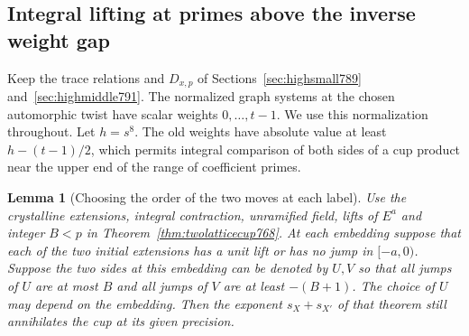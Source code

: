 \documentclass[a4paper,11pt]{article}
\newtheorem{lemma}[proposition]{Lemma}
\theoremstyle{definition}
\theoremstyle{remark}
\numberwithin{equation}{section}
\begin{document}
\subsection{Integral lifting at primes above the inverse weight gap}
\label{sec:hightail792}
Keep the trace relations and \(D_{x,p}\) of
Sections~\ref{sec:highsmall789} and~\ref{sec:highmiddle791}.
The normalized graph systems at the chosen automorphic twist
have scalar weights \(0,\ldots,t-1\). We use this normalization
throughout. Let \(h=s^8\). The old weights have absolute
value at least \(h-(t-1)/2\), which permits integral comparison
of both sides of a cup product near the upper end of the range
of coefficient primes.

\begin{lemma}[Choosing the order of the two moves at each label]
\leavevmode\label{lem:swappable792}
Use the crystalline extensions, integral contraction, unramified
field, lifts of \(E^a\) and integer \(B<p\) in
Theorem~\ref{thm:twolatticecup768}. At each embedding suppose
that each of the two initial extensions has a unit lift or has
no jump in \([-a,0)\). Suppose the two sides at this embedding
can be denoted by \(U,V\) so that all jumps of \(U\) are at
most \(B\) and all jumps of \(V\) are at least \(-(B+1)\).
The choice of \(U\) may depend on the embedding. Then the
exponent \(s_X+s_{X'}\) of that theorem still annihilates the
cup at its given precision.
\end{lemma}
\end{document}
